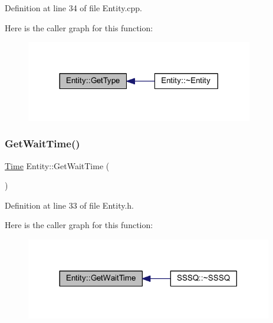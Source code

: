 Definition at line 34 of file Entity.\+cpp.

Here is the caller graph for this function\+:\nopagebreak
\begin{figure}[H]
\begin{center}
\leavevmode
\includegraphics[width=281pt]{class_entity_a6618c119290b237bd6f9e903d029405d_icgraph}
\end{center}
\end{figure}
\mbox{\label{class_entity_ae3fc482f0412da20727709c6659c8768}} 
\subsubsection{\texorpdfstring{Get\+Wait\+Time()}{GetWaitTime()}}
{\footnotesize\ttfamily \hyperlink{_simulation_executive_8h_ac2d3e0ba793497bcca555c7c2cf64ff3}{Time} Entity\+::\+Get\+Wait\+Time (\begin{DoxyParamCaption}{ }\end{DoxyParamCaption})\hspace{0.3cm}{\ttfamily [inline]}}



Definition at line 33 of file Entity.\+h.

Here is the caller graph for this function\+:\nopagebreak
\begin{figure}[H]
\begin{center}
\leavevmode
\includegraphics[width=305pt]{class_entity_ae3fc482f0412da20727709c6659c8768_icgraph}
\end{center}
\end{figure}
\mbox{\label{class_entity_ae05b43362e61b48a4a2ec5f629730029}} 
